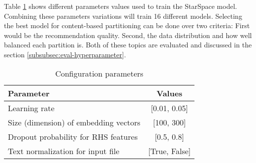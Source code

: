 Table \ref{tab:hyperparameter} shows different parameters values used to train the StarSpace model. Combining these parameters variations will train 16 different models. Selecting the best model for content-based partitioning can be done over two criteria: First would be the recommendation quality. Second, the data distribution and how well balanced each partition is. Both of these topics are evaluated and discussed in the section \ref{subsubsec:eval-hyperparameter}.


\begin{table}[!htb]
    \centering
    \caption{Configuration parameters}
    \label{tab:hyperparameter}
    \begin{tabular}{|l|c|}
        \hline
        \textbf{Parameter} & \textbf{Values} \\
        \hline
        Learning rate & [0.01, 0.05] \\
        \hline
        Size (dimension) of embedding vectors & [100, 300] \\
        \hline
        Dropout probability for RHS features & [0.5, 0.8] \\
        \hline
        Text normalization for input file & [True, False]\\
        \hline
    \end{tabular}
\end{table}
